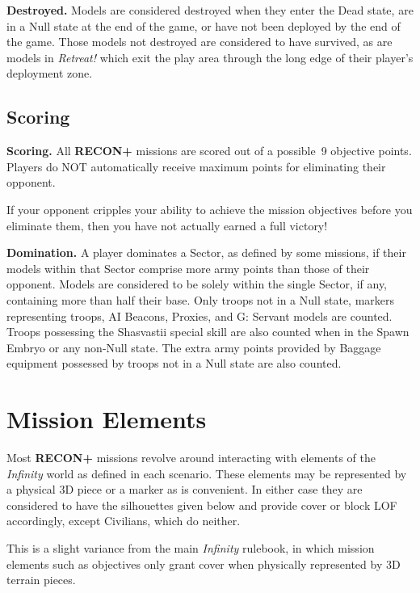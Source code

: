 \documentclass[14pt,dvipsnames]{extarticle}
\newcommand{\missionrule}[1]{\noindent\textbf{#1}\xspace}
\newcommand{\reconplus}{\textbf{RECON+}\xspace}
\begin{document}
\missionrule{Destroyed.} Models are considered destroyed when they
enter the Dead state, are in a Null state at the end of the game, or
have not been deployed by the end of the game.  Those models not
destroyed are considered to have survived, as are models in
\emph{Retreat!} which exit the play area through the long edge of
their player's deployment zone.

\subsection{Scoring}

\missionrule{Scoring.}  All \reconplus missions are scored out of a
possible~9 objective points.  Players do NOT automatically receive
maximum points for eliminating their opponent.
  
\begin{recon}
  If your opponent cripples your ability to achieve the mission
  objectives before you eliminate them, then you have not actually
  earned a full victory!
\end{recon}

\missionrule{Domination.}  A player dominates a Sector, as defined by
some missions, if their models within that Sector comprise more army
points than those of their opponent.  Models are considered to be
solely within the single Sector, if any, containing more than half
their base.  Only troops not in a Null state, markers representing
troops, AI Beacons, Proxies, and G: Servant models are counted.
Troops possessing the Shasvastii special skill are also counted when
in the Spawn Embryo or any non-Null state.  The extra army points
provided by Baggage equipment possessed by troops not in a Null state
are also counted.

\section{Mission Elements}

Most \reconplus missions revolve around interacting with elements of
the \emph{Infinity} world as defined in each scenario.  These elements
may be represented by a physical 3D piece or a marker as is
convenient.  In either case they are considered to have the
silhouettes given below and provide cover or block LOF accordingly,
except Civilians, which do neither.

\begin{recon}
  This is a slight variance from the main \emph{Infinity} rulebook, in
  which mission elements such as objectives only grant cover when
  physically represented by 3D terrain pieces.
\end{recon}
\end{document}

